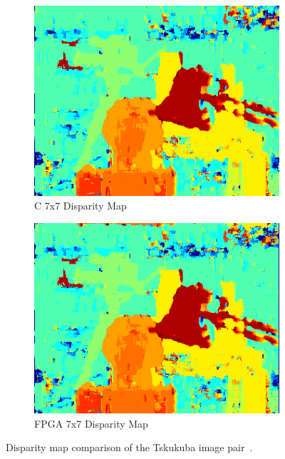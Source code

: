 \begin{figure}
\begin{center}
	\\
	\begin{subfigure}{0.45\textwidth}
		\includegraphics[width=\textwidth]{figures/tsukuba_c_7x7.png}
		\caption{C 7x7 Disparity Map}
		\label{fig:tsukubaC7x7}
	\end{subfigure}
	\begin{subfigure}{0.45\textwidth}
		\includegraphics[width=\textwidth]{figures/tsukuba_7x7_fpga.png}
		\caption{FPGA 7x7 Disparity Map}
		\label{fig:tsukubaFPGA7x7}
	\end{subfigure}
	\captionfonts
	\caption{Disparity map comparison of the Tskukuba image pair~\cite{middlebury}.}
	\label{fig:tsukubaDispMap}
\end{center}
\end{figure}

